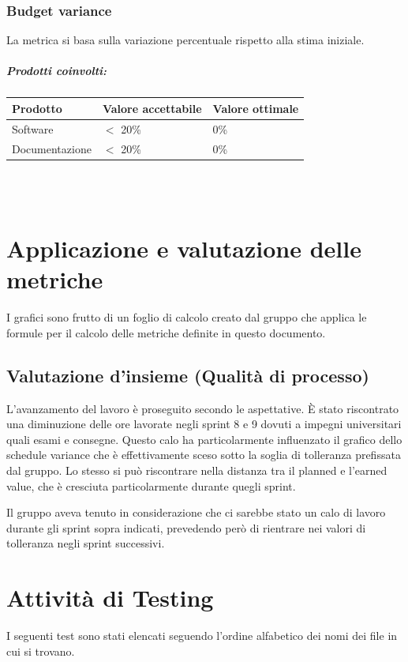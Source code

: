 \documentclass[a4paper, 12pt]{article}
\begin{document}
\subsubsection{Budget variance}
La metrica si basa sulla variazione percentuale rispetto alla stima iniziale.

\subparagraph{Prodotti coinvolti:}
\begin{center}
	\begin{tabularx}{\textwidth}{|X|X|X|}
		\hline
		\textbf{Prodotto} & \textbf{Valore accettabile } & \textbf{Valore ottimale } \\
		\hline
		Software          & $<$ 20\%                     & 0\%                       \\
		\hline
		Documentazione    & $<$ 20\%                     & 0\%                       \\
		\hline
	\end{tabularx}\\[8pt]
	\mbox{}\\
\end{center}

\section {Applicazione e valutazione delle metriche}
I grafici sono frutto di un foglio di calcolo creato dal gruppo che applica le formule per il calcolo delle metriche definite in questo documento.
\subsection{Valutazione d’insieme (Qualità di processo)}
L'avanzamento del lavoro è proseguito secondo le aspettative.
È stato riscontrato una diminuzione delle ore lavorate negli sprint 8 e 9 dovuti
a impegni universitari quali esami e consegne.
Questo calo ha particolarmente
influenzato il grafico dello schedule variance che è effettivamente sceso sotto la soglia di tolleranza prefissata dal gruppo.
Lo stesso si può riscontrare nella distanza tra il planned e l’earned value, che
è cresciuta particolarmente durante quegli sprint.

Il gruppo aveva tenuto in considerazione che ci sarebbe stato un calo di lavoro durante gli sprint sopra indicati, prevedendo però di rientrare nei valori di tolleranza negli sprint successivi.



\section{Attività di Testing}
I seguenti test sono stati elencati seguendo l'ordine alfabetico dei nomi dei file in cui si trovano.
\end{document}
